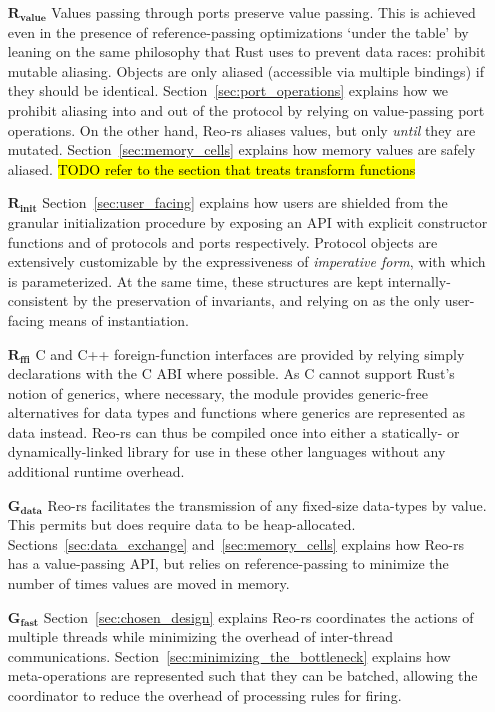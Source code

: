 \begin{enumerate}
	\item[$\boldsymbol{R_{value}}$] Values passing through ports preserve value passing. This is achieved even in the presence of reference-passing optimizations `under the table' by leaning on the same philosophy that Rust uses to prevent data races: prohibit mutable aliasing. Objects are only aliased (accessible via multiple bindings) if they should be identical. Section~\ref{sec:port_operations} explains how we prohibit aliasing into and out of the protocol by relying on value-passing port operations. On the other hand, Reo-rs aliases values, but only \textit{until} they are mutated. Section~\ref{sec:memory_cells} explains how memory values are safely aliased. \hl{TODO refer to the section that treats transform functions}
	
	\item[$\boldsymbol{R_{init}}$] Section~\ref{sec:user_facing} explains how users are shielded from the granular initialization procedure by exposing an API with explicit constructor functions  and  of protocols and ports respectively. Protocol objects are extensively customizable by the expressiveness of \textit{imperative form}, with which  is parameterized. At the same time, these structures are kept internally-consistent by the preservation of invariants, and relying on  as the only user-facing means of instantiation.
	
	\item[$\boldsymbol{R_{ffi}}$] C and C++ foreign-function interfaces are provided by relying simply declarations with the C ABI where possible. As C cannot support Rust's notion of generics, where necessary, the  module provides generic-free alternatives for data types and functions where generics are represented as data instead. Reo-rs can thus be compiled once into either a statically- or dynamically-linked library for use in these other languages without any additional runtime overhead.
	
	\item[$\boldsymbol{G_{data}}$] Reo-rs facilitates the transmission of any fixed-size data-types by value. This permits but does require data to be heap-allocated. Sections~\ref{sec:data_exchange} and~\ref{sec:memory_cells} explains how Reo-rs has a value-passing API, but relies on reference-passing to minimize the number of times values are moved in memory.
	
	\item[$\boldsymbol{G_{fast}}$] Section~\ref{sec:chosen_design} explains Reo-rs coordinates the actions of multiple threads while minimizing the overhead of inter-thread communications. Section~\ref{sec:minimizing_the_bottleneck} explains how meta-operations are represented such that they can be batched, allowing the coordinator to reduce the overhead of processing rules for firing.
	

\end{enumerate}
